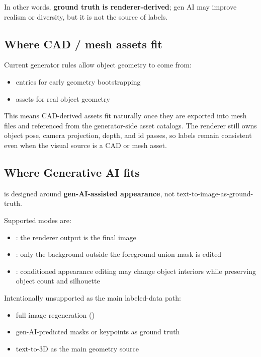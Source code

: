 In other words, \textbf{ground truth is renderer-derived}; gen AI may improve realism or diversity, but it is not the source of labels.

\subsection{Where CAD / mesh assets fit}

Current generator rules allow object geometry to come from:
\begin{itemize}
  \item {} entries for early geometry bootstrapping
  \item {} assets for real object geometry
\end{itemize}

This means CAD-derived assets fit naturally once they are exported into mesh files and referenced from the generator-side asset catalogs. The renderer still owns object pose, camera projection, depth, and id passes, so labels remain consistent even when the visual source is a CAD or mesh asset.

\subsection{Where Generative AI fits}

 is designed around \textbf{gen-AI-assisted appearance}, not text-to-image-as-ground-truth.

Supported modes are:
\begin{itemize}
  \item {}: the renderer output is the final image
  \item {}: only the background outside the foreground union mask is edited
  \item {}: conditioned appearance editing may change object interiors while preserving object count and silhouette
\end{itemize}

Intentionally unsupported as the main labeled-data path:
\begin{itemize}
  \item full image regeneration ()
  \item gen-AI-predicted masks or keypoints as ground truth
  \item text-to-3D as the main geometry source
\end{itemize}

